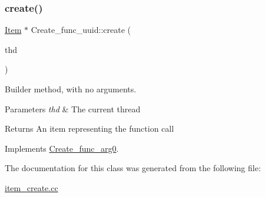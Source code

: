 \subsubsection{\texorpdfstring{create()}{create()}}
{\footnotesize\ttfamily \mbox{\hyperlink{classItem}{Item}} $\ast$ Create\+\_\+func\+\_\+uuid\+::create (\begin{DoxyParamCaption}\item[{T\+HD $\ast$}]{thd }\end{DoxyParamCaption})\hspace{0.3cm}{\ttfamily [virtual]}}

Builder method, with no arguments. 
\begin{DoxyParams}{Parameters}
{\em thd} & The current thread \\
\hline
\end{DoxyParams}
\begin{DoxyReturn}{Returns}
An item representing the function call 
\end{DoxyReturn}


Implements \mbox{\hyperlink{classCreate__func__arg0_abb65b43817f9382759c79487228ee29f}{Create\+\_\+func\+\_\+arg0}}.



The documentation for this class was generated from the following file\+:\begin{DoxyCompactItemize}
\item 
\mbox{\hyperlink{item__create_8cc}{item\+\_\+create.\+cc}}\end{DoxyCompactItemize}
